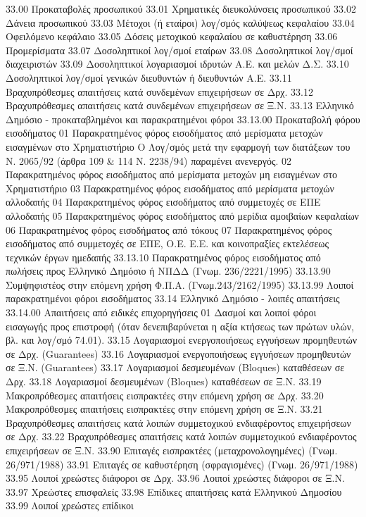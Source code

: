 \documentclass[A4,10pt,greek]{book}
\begin{document}
33.00   Προκαταβολές προσωπικού
33.01   Χρηματικές διευκολύνσεις προσωπικού
33.02   Δάνεια προσωπικού
33.03   Μέτοχοι (ή εταίροι) λογ/σμός καλύψεως κεφαλαίου
33.04   Οφειλόμενο κεφάλαιο
33.05   Δόσεις μετοχικού κεφαλαίου σε καθυστέρηση
33.06   Προμερίσματα
33.07   Δοσοληπτικοί λογ/σμοί εταίρων
33.08   Δοσοληπτικοί λογ/σμοί διαχειριστών
33.09   Δοσοληπτικοί λογαριασμοί ιδρυτών Α.Ε. και μελών Δ.Σ.
33.10   Δοσοληπτικοί λογ/σμοί γενικών διευθυντών ή διευθυντών Α.Ε.
33.11   Βραχυπρόθεσμες απαιτήσεις κατά συνδεμένων επιχειρήσεων σε Δρχ.
33.12   Βραχυπρόθεσμες απαιτήσεις κατά συνδεμένων επιχειρήσεων σε Ξ.Ν.
33.13   Ελληνικό Δημόσιο - προκαταβλημένοι και παρακρατημένοι φόροι
33.13.00   Προκαταβολή φόρου εισοδήματος
01   Παρακρατημένος φόρος εισοδήματος από μερίσματα μετοχών εισαγμένων στο Χρηματιστήριο Ο Λογ/σμός μετά την εφαρμογή των διατάξεων του Ν. 2065/92 (άρθρα 109 \& 114 Ν. 2238/94) παραμένει ανενεργός.
02   Παρακρατημένος φόρος εισοδήματος από μερίσματα μετοχών μη εισαγμένων στο Χρηματιστήριο
03   Παρακρατημένος φόρος εισοδήματος από μερίσματα μετοχών αλλοδαπής
04   Παρακρατημένος φόρος εισοδήματος από συμμετοχές σε ΕΠΕ αλλοδαπής
05   Παρακρατημένος φόρος εισοδήματος από μερίδια αμοιβαίων κεφαλαίων
06   Παρακρατημένος φόρος εισοδήματος από τόκους
07   Παρακρατημένος φόρος εισοδήματος από συμμετοχές σε ΕΠΕ, Ο.Ε. Ε.Ε. και κοινοπραξίες εκτελέσεως τεχνικών έργων ημεδαπής
33.13.10   Παρακρατημένος φόρος εισοδήματος από πωλήσεις προς Ελληνικό Δημόσιο ή ΝΠΔΔ (Γνωμ. 236/2221/1995)
33.13.90   Συμψηφιστέος στην επόμενη χρήση Φ.Π.Α. (Γνωμ.243/2162/1995)
33.13.99   Λοιποί παρακρατημένοι φόροι εισοδήματος
33.14   Ελληνικό Δημόσιο - λοιπές απαιτήσεις
33.14.00   Απαιτήσεις από ειδικές επιχορηγήσεις
      01   Δασμοί και λοιποί φόροι εισαγωγής προς επιστροφή (όταν δενεπιβαρύνεται η αξία κτήσεως των πρώτων υλών, βλ. και λογ/σμό 74.01).
33.15   Λογαριασμοί ενεργοποιήσεως εγγυήσεων προμηθευτών σε Δρχ. (Guarantees)
33.16   Λογαριασμοί ενεργοποιήσεως εγγυήσεων προμηθευτών σε Ξ.Ν. (Guarantees)
33.17   Λογαριασμοί δεσμευμένων (Bloques) καταθέσεων σε Δρχ.
33.18   Λογαριασμοί δεσμευμένων (Bloques) καταθέσεων σε Ξ.Ν.
33.19   Μακροπρόθεσμες απαιτήσεις εισπρακτέες στην επόμενη χρήση σε Δρχ.
33.20   Μακροπρόθεσμες απαιτήσεις εισπρακτέες στην επόμενη χρήση σε Ξ.Ν.
33.21   Βραχυπρόθεσμες απαιτήσεις κατά λοιπών συμμετοχικού ενδιαφέροντος επιχειρήσεων σε Δρχ.
33.22   Βραχυπρόθεσμες απαιτήσεις κατά λοιπών συμμετοχικού ενδιαφέροντος επιχειρήσεων σε Ξ.Ν.
33.90   Επιταγές εισπρακτέες (μεταχρονολογημένες) (Γνωμ. 26/971/1988)
33.91   Επιταγές σε καθυστέρηση (σφραγισμένες) (Γνωμ. 26/971/1988)
33.95   Λοιποί χρεώστες διάφοροι σε Δρχ.
33.96   Λοιποί χρεώστες διάφοροι σε Ξ.Ν.
33.97   Χρεώστες επισφαλείς
33.98    Επίδικες απαιτήσεις κατά Ελληνικού Δημοσίου
33.99    Λοιποί χρεώστες επίδικοι
\end{document}
